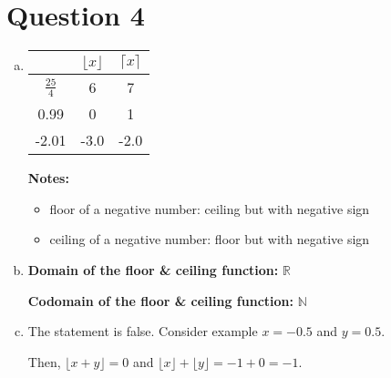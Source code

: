 \documentclass[12pt]{article}
\begin{document}
\section*{Question 4}
\begin{enumerate}[a.]

    \item

    \begin{tabular}{|c|c|c|}
        \hline
         & $\lfloor x \rfloor$ & $\lceil x \rceil$\\
        \hline
        $\frac{25}{4}$ & 6 & 7\\
        \hline
        0.99 & 0 & 1\\
        \hline
        -2.01 & -3.0 & -2.0\\
        \hline
    \end{tabular}

    \bigskip

    \textbf{Notes:}

    \begin{itemize}
        \item floor of a negative number: ceiling but with negative sign
        \item ceiling of a negative number: floor but with negative sign
    \end{itemize}

    \item

    \textbf{Domain of the floor \& ceiling function:} $\mathbb{R}$

    \textbf{Codomain of the floor \& ceiling function:} $\mathbb{N}$

    \item

    The statement is false. Consider example $x = -0.5$ and $y = 0.5$.

    \bigskip

    Then, $\lfloor x + y \rfloor = 0$ and $\lfloor x \rfloor + \lfloor y \rfloor = -1 + 0 = -1$.

\end{enumerate}
\end{document}
